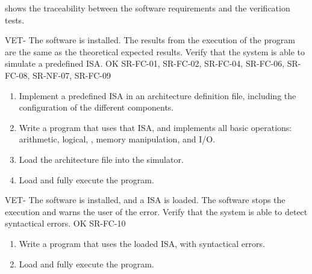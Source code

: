  shows the traceability between the software requirements and the verification tests.

\setcounter{i}{1}

\begin{testCase}{VET-}
  {The software is installed.}  %
  {The results from the execution of the program are the same as the theoretical expected results.}  %
  {Verify that the system is able to simulate a predefined \gls{ISA}.}  %
  {OK}  %
  {SR-FC-01, SR-FC-02, SR-FC-04, SR-FC-06, SR-FC-08, SR-NF-07, SR-FC-09}  %
  \begin{enumerate}[leftmargin=*, topsep=0pt, noitemsep]  %
    \item Implement a predefined \gls{ISA} in an architecture definition file, including the configuration of the different components.
    \item Write a program that uses that \gls{ISA}, and implements all basic operations: arithmetic, logical, , memory manipulation, and \gls{I/O}.
    \item Load the architecture file into the simulator.
    \item Load and fully execute the program.
  \end{enumerate}
\end{testCase}

\begin{testCase}{VET-}
  {The software is installed, and a \gls{ISA} is loaded.}  %
  {The software stops the execution and warns the user of the error.}  %
  {Verify that the system is able to detect syntactical errors.}  %
  {OK}  %
  {SR-FC-10}  %
  \begin{enumerate}[leftmargin=*, topsep=0pt, noitemsep]  %
    \item Write a program that uses the loaded \gls{ISA}, with syntactical errors.
    \item Load and fully execute the program.
  \end{enumerate}
\end{testCase}

